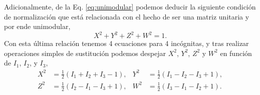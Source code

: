 Adicionalmente, de la Eq. \ref{eq:unimodular} podemos deducir la siguiente condición de
normalización que está relacionada con el hecho de ser una matriz
unitaria y por ende unimodular,
\begin{equation*}
X^2+Y^2+Z^2+W^2 =1.
\end{equation*}
Con esta última relación tenemos 4 ecuaciones para 4 incógnitas, y
tras realizar operaciones simples de sustitución podemos despejar
$X^2$, $Y^2$, $Z^2$ y $W^2$ en función de $I_1$, $I_2$, y $I_3$,
\begin{align*}
X^2 &= \frac{1}{2}\left( I_1+I_2+I_3-1\right), & Y^2 &=
                                                       \frac{1}{2}\left(
                                                       I_1-I_2-I_3+1\right),\\
Z^2 &= \frac{1}{2}\left( I_2-I_1-I_3+1\right), & W^2 &=
                                                       \frac{1}{2}\left(
                                                       I_3-I_1-I_2+1\right).\\
\end{align*}

